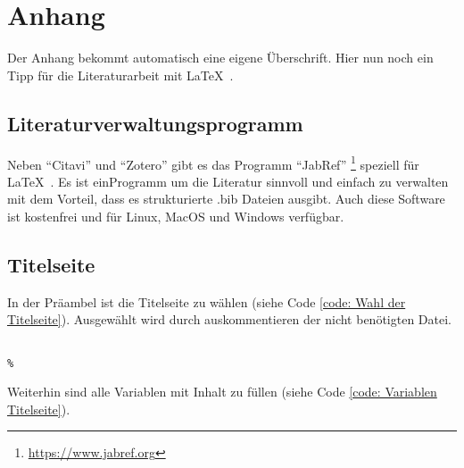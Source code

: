 \appendix

\section{Anhang}

Der Anhang bekommt automatisch eine eigene Überschrift. Hier nun noch ein Tipp für die Literaturarbeit mit \LaTeX\ .

\subsection{Literaturverwaltungsprogramm}

Neben \enquote{Citavi} und \enquote{Zotero} gibt es das Programm \enquote{JabRef} \footnote{\url{https://www.jabref.org}} speziell für \LaTeX\ . Es ist einProgramm um die Literatur sinnvoll und einfach zu verwalten mit dem Vorteil, dass es strukturierte .bib Dateien ausgibt. Auch diese Software ist kostenfrei und für Linux, MacOS und Windows verfügbar.

\subsection{Titelseite}

In der Präambel ist die Titelseite zu wählen (siehe Code \ref{code: Wahl der Titelseite}). Ausgewählt wird durch auskommentieren der nicht benötigten Datei.

\begin{lstlisting}[caption={Wahl der Titelseite}, label=code: Wahl der Titelseite]
% Titelseite auswaehlen

%
\end{lstlisting}

Weiterhin sind alle Variablen mit Inhalt zu füllen (siehe Code \ref{code: Variablen Titelseite}).

